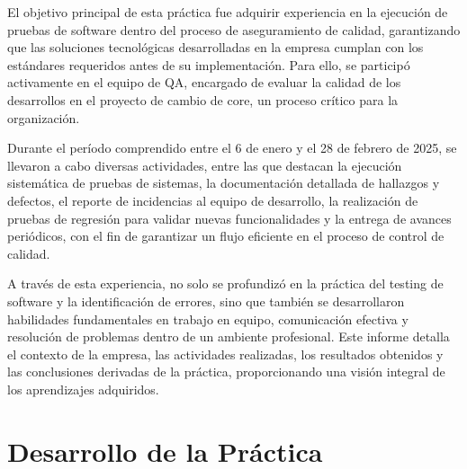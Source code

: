 \documentclass[12pt,a4paper]{report}
\begin{document}
El objetivo principal de esta práctica fue adquirir experiencia en la ejecución de pruebas de software dentro del proceso de aseguramiento de calidad, garantizando que las soluciones tecnológicas desarrolladas en la empresa cumplan con los estándares requeridos antes de su implementación. Para ello, se participó activamente en el equipo de QA, encargado de evaluar la calidad de los desarrollos en el proyecto de cambio de core, un proceso crítico para la organización.

Durante el período comprendido entre el 6 de enero y el 28 de febrero de 2025, se llevaron a cabo diversas actividades, entre las que destacan la ejecución sistemática de pruebas de sistemas, la documentación detallada de hallazgos y defectos, el reporte de incidencias al equipo de desarrollo, la realización de pruebas de regresión para validar nuevas funcionalidades y la entrega de avances periódicos, con el fin de garantizar un flujo eficiente en el proceso de control de calidad.

A través de esta experiencia, no solo se profundizó en la práctica del testing de software y la identificación de errores, sino que también se desarrollaron habilidades fundamentales en trabajo en equipo, comunicación efectiva y resolución de problemas dentro de un ambiente profesional. Este informe detalla el contexto de la empresa, las actividades realizadas, los resultados obtenidos y las conclusiones derivadas de la práctica, proporcionando una visión integral de los aprendizajes adquiridos.

\chapter{Desarrollo de la Práctica}

\end{document}
